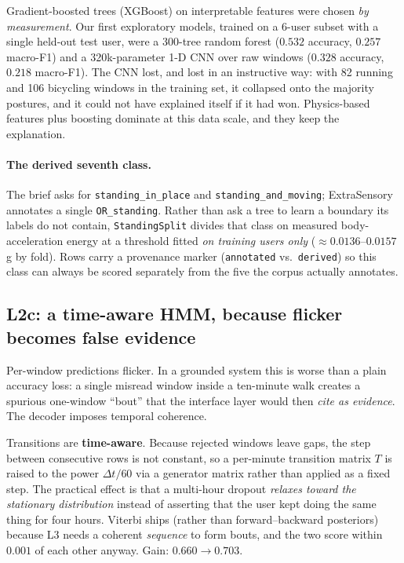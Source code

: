 \documentclass[11pt,a4paper]{article}
\newcommand{\code}[1]{\texttt{\small #1}}
\begin{document}
Gradient-boosted trees (XGBoost) on interpretable features were chosen \emph{by
measurement}. Our first exploratory models, trained on a 6-user subset with a single
held-out test user, were a 300-tree random forest ($0.532$ accuracy, $0.257$ macro-F1)
and a 320k-parameter 1-D CNN over raw windows ($0.328$ accuracy, $0.218$ macro-F1). The
CNN lost, and lost in an instructive way: with 82 running and 106 bicycling windows in
the training set, it collapsed onto the majority postures, and it could not have
explained itself if it had won. Physics-based features plus boosting dominate at this
data scale, and they keep the explanation.

\paragraph{The derived seventh class.} The brief asks for \code{standing\_in\_place} and
\code{standing\_and\_moving}; ExtraSensory annotates a single \code{OR\_standing}.
Rather than ask a tree to learn a boundary its labels do not contain, \code{StandingSplit}
divides that class on measured body-acceleration energy at a threshold fitted
\emph{on training users only} ($\approx 0.0136$--$0.0157$\,g by fold). Rows carry a
provenance marker (\code{annotated} vs.\ \code{derived}) so this class can always be
scored separately from the five the corpus actually annotates.

\subsection{L2c: a time-aware HMM, because flicker becomes false evidence}

Per-window predictions flicker. In a grounded system this is worse than a plain accuracy
loss: a single misread window inside a ten-minute walk creates a spurious one-window
``bout'' that the interface layer would then \emph{cite as evidence}. The decoder imposes
temporal coherence.

Transitions are \textbf{time-aware}. Because rejected windows leave gaps, the step
between consecutive rows is not constant, so a per-minute transition matrix $T$ is
raised to the power $\Delta t / 60$ via a generator matrix rather than applied as a
fixed step. The practical effect is that a multi-hour dropout \emph{relaxes toward the
stationary distribution} instead of asserting that the user kept doing the same thing
for four hours. Viterbi ships (rather than forward--backward posteriors) because L3
needs a coherent \emph{sequence} to form bouts, and the two score within $0.001$ of each
other anyway. Gain: \textbf{$0.660 \rightarrow 0.703$}.
\end{document}
